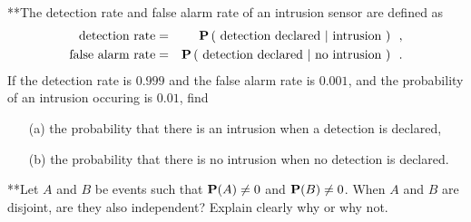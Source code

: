\begin{ExerciseList}
\Exercise
{**}The detection rate and false alarm rate of an intrusion sensor are defined as
\begin{eqnarray*}
\text{detection rate} &=& \mathbf{P} \left( \text{ detection declared } | \text{ intrusion } \right) \enspace ,\\
\text{false alarm rate} &=& \mathbf{P} \left( \text{ detection declared } | \text{ no intrusion } \right) \enspace .
\end{eqnarray*}
If the detection rate is $0.999$ and the false alarm rate is $0.001$, and the probability of an intrusion occuring is $0.01$, find
\begin{itemize}
\item[(a)] the probability that there is an intrusion when a detection is declared,
\item[(b)] the probability that there is no intrusion when no detection is declared.
\end{itemize}

\Exercise
{**}Let $A$ and $B$ be events such that $\mathbf{P}(A) \neq 0$ and $\mathbf{P}(B) \neq 0$.  
When $A$ and $B$ are disjoint, are they also independent?  
Explain clearly why or why not.

\end{ExerciseList}


